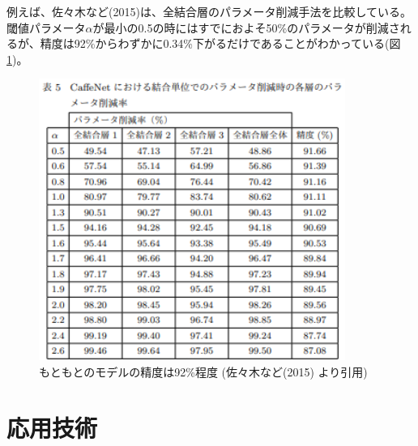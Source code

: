 \documentclass{ltjsarticle}
\begin{document}
例えば、佐々木など(2015)は、全結合層のパラメータ削減手法を比較している。閾値パラメータ$\alpha$が最小の0.5の時にはすでにおよそ50\%のパラメータが削減されるが、精度は92\%からわずかに0.34\%下がるだけであることがわかっている(図\ref{fig:pruning_table})。
\begin{figure}[htbp]
  \centering
  \includegraphics[width=10cm]{./capture/pruning_table.png}
  \caption{もともとのモデルの精度は92\%程度 (佐々木など(2015) より引用)}
  \label{fig:pruning_table}
\end{figure}

\clearpage

\section{応用技術}
\end{document}
